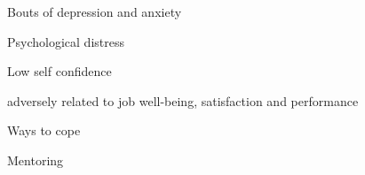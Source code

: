 \documentclass[aspectratio=169]{beamer}
\begin{document}
\begin{frame}
  \begin{center}
    \Huge Bouts of depression and anxiety
  \end{center}
\end{frame}


\begin{frame}
  \begin{center}
    \Huge Psychological distress
  \end{center}
\end{frame}

\begin{frame}
  \begin{center}
    \Huge Low self confidence
  \end{center}
\end{frame}

\begin{frame}
  \begin{center}
    \Huge adversely related to job well-being, satisfaction and performance
  \end{center}
\end{frame}

\begin{frame}
  \begin{center}
    \Huge Ways to cope
  \end{center}
\end{frame}

\begin{frame}
  \begin{center}
    \Huge Mentoring
  \end{center}
\end{frame}

\begin{frame}
  \begin{center}
    \Huge
  \end{center}
\end{frame}

\begin{frame}
  \begin{center}
    \Huge
  \end{center}
\end{frame}

\begin{frame}
  \begin{center}
    \Huge
  \end{center}
\end{frame}
\end{document}
